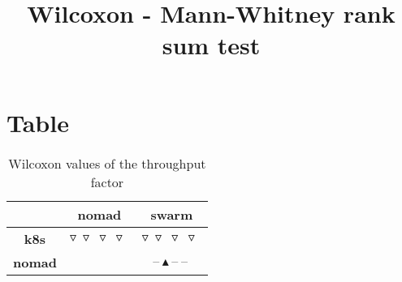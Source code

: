\documentclass{article}
\title{Wilcoxon - Mann-Whitney rank sum test}
\author{}
\begin{document}
\maketitle
\section{Table}
\begin{table}[!htp]
  \caption{Wilcoxon values of the throughput factor}
  \label{table:throughput}
  \centering
  \begin{scriptsize}
  \begin{tabular}{c|cc}
      & \textbf{nomad} & \textbf{swarm} \\\hline
      \textbf{k8s} & $\triangledown\ \triangledown\ \triangledown\ \triangledown\  $ & $ \triangledown\ \triangledown\ \triangledown\ \triangledown\ $ \\
      \textbf{nomad} & $ $ & $ \text{--}\ \blacktriangle\ \text{--}\ \text{--}\ $ \\
  \end{tabular}
  \end{scriptsize}
\end{table}
\end{document}
